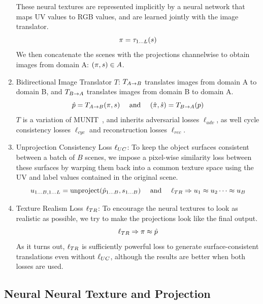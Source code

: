 \documentclass{article}
\begin{document}
\begin{enumerate}
{			These neural textures are represented implicitly by a neural network that maps UV values to RGB values, and are learned jointly with the image translator.
			\begin{equation}
				\pi=\tau_{1\dots L}(s)
			\end{equation}
			We then concatenate the scenes with the projections channelwise to obtain images from domain A: $(\pi,s) \in A$.
		}
		\item{
			Bidirectional Image Translator $T$: $T_{A\rightarrow B}$ translates images from domain A to domain B, and $T_{B\rightarrow A}$ translates images from domain B to domain A.
			\begin{equation}
				\ph=\Tab(\pis)\ \ \ \text{ and }\ \ \ \ppish=\Tba(p)
			\end{equation}
			$T$ is a variation of MUNIT~\cite{munit}, and inherits adversarial losses $\ell_{adv}$, as well cycle consistency losses $\ell_{cyc}$ and reconstruction losses $\ell_{rec}$.
		}
		\item {
			Unprojection Consistency Loss $\ell_{UC}$: To keep the object surfaces consistent between a batch of $B$ scenes, we impose a pixel-wise similarity loss between these surfaces by warping them back into a common texture space using the UV and label values contained in the original scene. 
			\begin{equation}
				u\toBL=\text{unproject}(\ph\toB,s\toB)\ \ \ \text{ and } \ \ \ \lTR \Rightarrow u_1 \approx u_2 \dots \approx u_B
			\end{equation}
		}
		\item{
			Texture Realism Loss $\ell_{TR}$: To encourage the neural textures to look as realistic as possible, we try to make the projections look like the final output. 
			\begin{equation}
				\ell_{TR} \Rightarrow \pi \approx \hat{p}
			\end{equation}
			As it turns out, $\ell_{TR}$ is sufficiently powerful loss to generate surface-consistent translations even without $\ell_{UC}$, although the results are better when both losses are used.
		}
		
	\end{enumerate}

\subsection{Neural Neural Texture and Projection}
\end{document}
